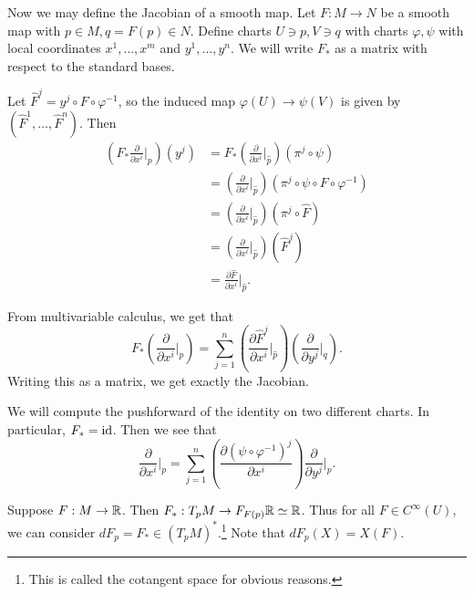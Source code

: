 \documentclass[twoside, 10pt]{article}
\begin{document}
    Now we may define the Jacobian of a smooth map.  Let $F:M \to N$ be a
    smooth map with $p \in M, q = F(p) \in N$. Define charts $U \ni p, V \ni q$
    with charts $\varphi, \psi$ with local coordinates $x^1, \ldots, x^m$ and
    $y^1, \ldots, y^n$. We will write $F_*$ as a matrix with respect to the
    standard bases.
    
    Let $\widehat{F}^j = y^j \circ F \circ \varphi^{-1}$, so the induced map
    $\varphi(U) \to \psi(V)$ is given by $(\widehat{F}^1, \ldots,
    \widehat{F}^n)$. Then \begin{align*} \left( F_* \frac{\partial}{\partial
        x^i}\bigg\vert_p\right) (y^j) &= F_* \left( \frac{\partial}{\partial
x^i}\bigg\vert_{\widehat{p}} \right) (\pi^j \circ \psi) \\ &= \left(
\frac{\partial}{\partial x^i}\bigg\vert_{\widehat{p}} \right) (\pi^j \circ \psi
\circ F \circ \varphi^{-1}) \\ &= \left( \frac{\partial}{\partial
x^i}\bigg\vert_{\widehat{p}} \right) (\pi^j \circ \widehat{F}) \\ &= \left(
\frac{\partial}{\partial x^i}\bigg\vert_{\widehat{p}} \right) (\widehat{F}^j)
                                                               \\ &=
                                                               \frac{\partial
                                                               \widehat{F}}{\partial
                                                           x^i}\bigg\vert_{\widehat{p}}.
                                                           \end{align*}

    From multivariable calculus, we get that \[ F_* \left(
    \frac{\partial}{\partial x^i}\bigg\vert_p \right) = \sum_{j=1}^n \left(
    \frac{\partial \widehat{F}^j}{\partial x^i} \bigg\vert_{\widehat{p}}
    \right) \left( \frac{\partial}{\partial y^j} \bigg\vert_q \right).\]
    Writing this as a matrix, we get exactly the Jacobian.

    \begin{exm} We will compute the pushforward of the identity on two
        different charts. In particular, $F_* = \mathrm{id}$. Then we see that \[
        \frac{\partial}{\partial x^i}\bigg\vert_p = \sum_{j=1}^{n} \left(
    \frac{\partial (\psi \circ \varphi^{-1})^j}{\partial x^i} \right)
\frac{\partial}{\partial y^j} \bigg\vert_p.\] \end{exm}

    \begin{exm} Suppose $F:M \to \mathbb{R}$. Then $F_*:T_pM \to F_{F(p)}\mathbb{R} \simeq \mathbb{R}$.
        Thus for all $F \in C^{\infty}(U)$, we can consider $dF_p = F_* \in
        (T_pM)^*$.\footnote{This is called the cotangent space for obvious
        reasons.} Note that $dF_p(X) = X(F)$.  \end{exm}
\end{document}
